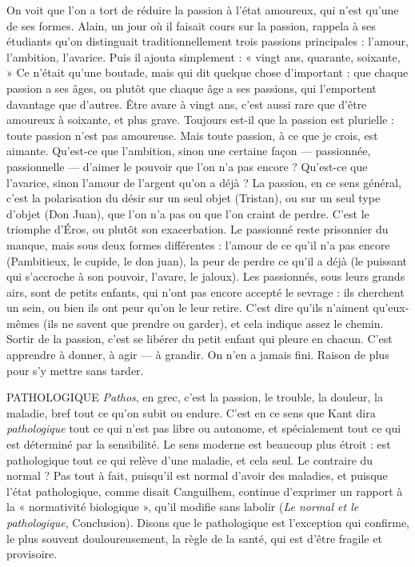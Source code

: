 On voit que l’on a tort de réduire la passion à l’état amoureux, qui n’est
qu’une de ses formes. Alain, un jour où il faisait cours sur la passion, rappela à
ses étudiants qu’on distinguait traditionnellement trois passions principales :
l'amour, l'ambition, l’avarice. Puis il ajouta simplement : « vingt ans, quarante,
soixante, » Ce n’était qu’une boutade, mais qui dit quelque chose d’important :
que chaque passion a ses âges, ou plutôt que chaque âge a ses passions, qui
l’emportent davantage que d’autres. Être avare à vingt ans, c’est aussi rare que
d’être amoureux à soixante, et plus grave. Toujours est-il que la passion est
plurielle : toute passion n’est pas amoureuse. Mais toute passion, à ce que je
crois, est aimante. Qu'est-ce que l’ambition, sinon une certaine façon — passionnée,
passionnelle — d’aimer le pouvoir que l’on n’a pas encore ? Qu'est-ce
que l’avarice, sinon l’amour de l’argent qu’on a déjà ? La passion, en ce sens
général, c’est la polarisation du désir sur un seul objet (Tristan), ou sur un seul
type d’objet (Don Juan), que l’on n’a pas ou que l’on craint de perdre. C’est le
triomphe d’Éros, ou plutôt son exacerbation. Le passionné reste prisonnier du
manque, mais sous deux formes différentes : l'amour de ce qu’il n’a pas encore
(Pambitieux, le cupide, le don juan), la peur de perdre ce qu’il a déjà (le puissant
qui s'accroche à son pouvoir, l’avare, le jaloux). Les passionnés, sous leurs
grands airs, sont de petits enfants, qui n’ont pas encore accepté le sevrage : ils
cherchent un sein, ou bien ils ont peur qu’on le leur retire. C’est dire qu’ils
n'aiment qu’eux-mêmes (ils ne savent que prendre ou garder), et cela indique
assez le chemin. Sortir de la passion, c’est se libérer du petit enfant qui pleure
en chacun. C’est apprendre à donner, à agir — à grandir. On n’en a jamais fini.
Raison de plus pour s’y mettre sans tarder.

PATHOLOGIQUE {\it Pathos}, en grec, c’est la passion, le trouble, la douleur, la
maladie, bref tout ce qu’on subit ou endure. C’est en ce
sens que Kant dira {\it pathologique} tout ce qui n’est pas libre ou autonome, et spécialement
tout ce qui est déterminé par la sensibilité. Le sens moderne est beaucoup
plus étroit : est pathologique tout ce qui relève d’une maladie, et cela seul.
Le contraire du normal ? Pas tout à fait, puisqu'il est normal d’avoir des maladies,
et puisque l’état pathologique, comme disait Canguilhem, continue
d'exprimer un rapport à la « normativité biologique », qu’il modifie sans
labolir ({\it Le normal et le pathologique}, Conclusion). Disons que le pathologique
est l’exception qui confirme, le plus souvent douloureusement, la règle de la
santé, qui est d’être fragile et provisoire.

